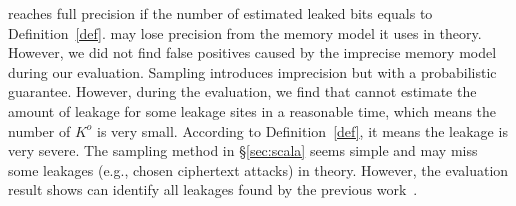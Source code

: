 \tool{} reaches full precision if the number of estimated leaked bits 
equals to Definition~\ref{def}. 
\tool{} may lose precision from the 
memory model it uses in theory. However, we did not find false positives 
caused by the imprecise memory model during our evaluation. 
Sampling introduces imprecision but with a probabilistic guarantee. 
However, during the evaluation, we find that \tool{} cannot estimate 
the amount of leakage for some leakage sites in a reasonable time, 
which means the number of $K^o$ is very small. According to Definition~\ref{def}, 
it means the leakage is very severe. The sampling method in \S\ref{sec:scala} seems
simple and may miss some leakages (e.g., chosen ciphertext attacks) in theory. 
However, the evaluation result 
shows \tool{} can identify all leakages found by the previous work~\cite{203878,236338,Brotzman19Casym}.
